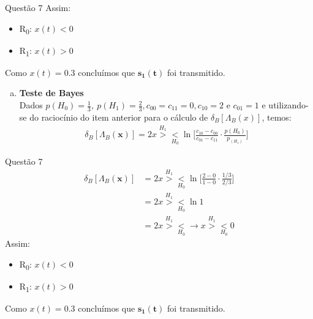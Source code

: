 \documentclass{beamer}\usepackage[]{graphicx}\usepackage[]{color}
\begin{document}
		\begin{frame}{Questão 7}
			Assim:
			\begin{itemize}
				\item R\textsubscript{0}: $x(t) < 0$
				\item R\textsubscript{1}: $x(t) > 0$
			\end{itemize}
			Como $x(t) = 0.3$ concluímos que $\boldsymbol{s_{1}(t)}$ foi transmitido.\\
			
			\begin{enumerate}[b)]
				\item \textbf{Teste de Bayes}\\
				Dados $p(H_{0}) = \frac{1}{3},~p(H_{1}) = \frac{2}{3}, c_{00} = c_{11} = 0, c_{10} = 2$ e $c_{01} = 1$ e utilizando-se do raciocínio do item anterior para o cálculo de $\delta_{B}[\Lambda_{B}(x)]$, temos:
				\begin{align*}
					\delta_{B}[\Lambda_{B}(\boldsymbol{x})] = 2x \overset{H_{1}}{>} \underset{H_{0}}{<} \ln \Bigg[ \frac{c_{10} - c_{00}}{c_{01} - c_{11}} \cdot \frac{p(H_{0})}{p_(H_{1})}\Bigg] 
				\end{align*}
			\end{enumerate}
		\end{frame}
		
		\begin{frame}{Questão 7}
			\begin{align*}
				\delta_{B}[\Lambda_{B}(\boldsymbol{x})] &= 2x \overset{H_{1}}{>} \underset{H_{0}}{<} \ln \Bigg[  \frac{2 - 0}{1 - 0} \cdot \frac{1/3}{2/3}\Bigg]\\
				&= 2x \overset{H_{1}}{>} \underset{H_{0}}{<} \ln 1\\
				&= 2x \overset{H_{1}}{>} \underset{H_{0}}{<} \rightarrow  x \overset{H_{1}}{>} \underset{H_{0}}{<} 0
			\end{align*}
				Assim:
			\begin{itemize}
				\item R\textsubscript{0}: $x(t) < 0$
				\item R\textsubscript{1}: $x(t) > 0$
			\end{itemize}
			Como $x(t) = 0.3$ concluímos que $\boldsymbol{s_{1}(t)}$ foi transmitido.\\
		\end{frame}
		
\end{document}

